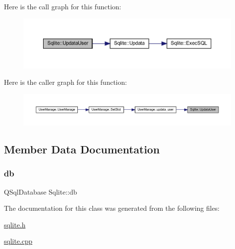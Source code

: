 Here is the call graph for this function\+:
\nopagebreak
\begin{figure}[H]
\begin{center}
\leavevmode
\includegraphics[width=350pt]{class_sqlite_aba86a5371a532d0c7600f9a70c2d00a5_cgraph}
\end{center}
\end{figure}
Here is the caller graph for this function\+:
\nopagebreak
\begin{figure}[H]
\begin{center}
\leavevmode
\includegraphics[width=350pt]{class_sqlite_aba86a5371a532d0c7600f9a70c2d00a5_icgraph}
\end{center}
\end{figure}


\subsection{Member Data Documentation}
\mbox{\label{class_sqlite_afaaed0591ef0d92547dc5f049a22b3a6}} 
\subsubsection{\texorpdfstring{db}{db}}
{\footnotesize\ttfamily Q\+Sql\+Database Sqlite\+::db\hspace{0.3cm}{\ttfamily [private]}}



The documentation for this class was generated from the following files\+:\begin{DoxyCompactItemize}
\item 
\mbox{\hyperlink{sqlite_8h}{sqlite.\+h}}\item 
\mbox{\hyperlink{sqlite_8cpp}{sqlite.\+cpp}}\end{DoxyCompactItemize}
